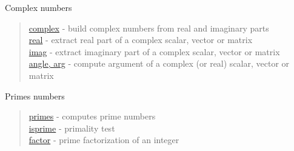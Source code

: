 Complex numbers

\begin{quote}
\noindent
\hyperlink{complex}{complex} - build complex numbers from real and imaginary parts\\
\hyperlink{real}{real} - extract real part of a complex scalar, vector or matrix\\
\hyperlink{imag}{imag} - extract imaginary part of a complex scalar, vector or matrix\\
\hyperlink{angle, arg}{angle, arg} - compute argument of a complex (or real) scalar, vector or matrix\\
\end{quote}

Primes numbers

\begin{quote}
\noindent
\hyperlink{primes}{primes} - computes prime numbers\\
\hyperlink{isprime}{isprime} - primality test\\
\hyperlink{factor}{factor} - prime factorization of an integer\\
\end{quote}





 
 
 
 
 
 
 
 


